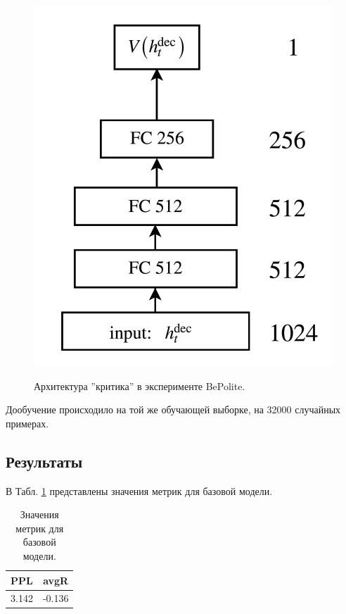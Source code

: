 \documentclass[12pt,a4paper]{amsart}
\begin{document}
\begin{figure}[htbp!]
	\caption{Архитектура ''критика'' в эксперименте BePolite.}
	\includegraphics[scale=0.5]{imgs/critic.png}
	\label{fig:critic}
	\centering
\end{figure}

Дообучение происходило на той же обучающей выборке, на 32000 случайных примерах.

\subsection{Результаты}

В Табл. \ref{table:bepolite-baseline} представлены значения метрик для базовой модели.

\begingroup
\renewcommand{\arraystretch}{1.8}
\begin{center}
	\begin{table}[htbp]
		\caption{Значения метрик для базовой модели.}
		\label{table:bepolite-baseline}
		\begin{tabular}{|c|c|}
			\hline
			\textbf{PPL} & \textbf{avgR} \\ 
			\hline
			3.142 & -0.136 \\
			\hline
		\end{tabular}
	\end{table}
\end{center}
\endgroup
\end{document}
